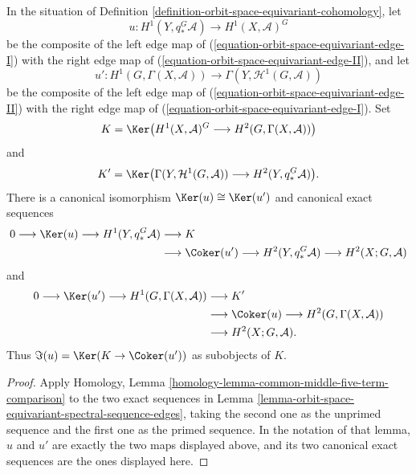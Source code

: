 \begin{example}
\label{example-orbit-space-equivariant-five-term-comparison}
\begin{reference}
\cite[Chapter V, \S 5.2, (5.2.12) and the following example,
p. 203]{Tohoku}
\end{reference}
In the situation of Definition
\ref{definition-orbit-space-equivariant-cohomology}, let
$$
u : H^1(Y, q_*^G\mathcal{A}) \longrightarrow H^1(X, \mathcal{A})^G
$$
be the composite of the left edge map of
(\ref{equation-orbit-space-equivariant-edge-I}) with the right edge map of
(\ref{equation-orbit-space-equivariant-edge-II}), and let
$$
u' : H^1(G, \Gamma(X, \mathcal{A}))
\longrightarrow \Gamma(Y, \mathcal{H}^1(G, \mathcal{A}))
$$
be the composite of the left edge map of
(\ref{equation-orbit-space-equivariant-edge-II}) with the right edge map of
(\ref{equation-orbit-space-equivariant-edge-I}). Set
$$
K = \Ker\bigl(H^1(X, \mathcal{A})^G
\longrightarrow H^2(G, \Gamma(X, \mathcal{A}))\bigr)
$$
and
$$
K' = \Ker\bigl(\Gamma(Y, \mathcal{H}^1(G, \mathcal{A}))
\longrightarrow H^2(Y, q_*^G\mathcal{A})\bigr).
$$
There is a canonical isomorphism $\Ker(u)\cong\Ker(u')$ and canonical
exact sequences
$$
\begin{aligned}
0 \longrightarrow \Ker(u) \longrightarrow H^1(Y, q_*^G\mathcal{A})
&\longrightarrow K \\
&\longrightarrow \Coker(u')
\longrightarrow H^2(Y, q_*^G\mathcal{A})
\longrightarrow H^2(X; G, \mathcal{A})
\end{aligned}
$$
and
$$
\begin{aligned}
0 \longrightarrow \Ker(u')
\longrightarrow H^1(G, \Gamma(X, \mathcal{A}))
&\longrightarrow K' \\
&\longrightarrow \Coker(u)
\longrightarrow H^2(G, \Gamma(X, \mathcal{A})) \\
&\longrightarrow H^2(X; G, \mathcal{A}).
\end{aligned}
$$
Thus $\Im(u)=\Ker(K\to\Coker(u'))$ as subobjects of $K$.
\end{example}

\begin{proof}
Apply Homology, Lemma
\ref{homology-lemma-common-middle-five-term-comparison} to the two exact
sequences in Lemma
\ref{lemma-orbit-space-equivariant-spectral-sequence-edges}, taking the
second one as the unprimed sequence and the first one as the primed
sequence. In the notation of that lemma, $u$ and $u'$ are exactly the two
maps displayed above, and its two canonical exact sequences are the ones
displayed here.
\end{proof}

